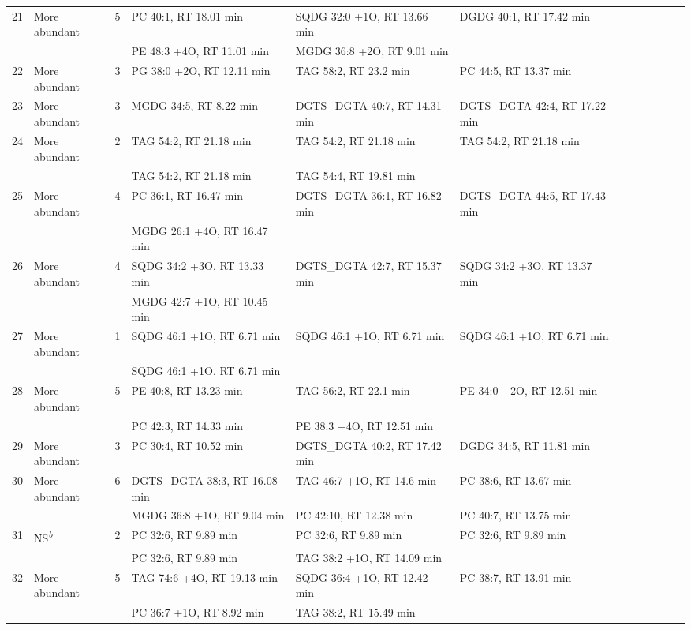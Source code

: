 \begin{landscape}
\begin{footnotesize}
\begin{singlespace}
\begin{flushleft}
\begin{longtable}{ Lp{.03\linewidth} Lp{.12\linewidth} Lp{.03\linewidth} Lp{.24\linewidth} Lp{.24\linewidth} Lp{.24\linewidth} }
21 & More abundant & 5 & PC 40:1, RT 18.01 min & SQDG 32:0 +1O, RT 13.66 min & DGDG 40:1, RT 17.42 min \\
 &  &  & PE 48:3 +4O, RT 11.01 min & MGDG 36:8 +2O, RT 9.01 min &  \\
22 & More abundant & 3 & PG 38:0 +2O, RT 12.11 min & TAG 58:2, RT 23.2 min & PC 44:5, RT 13.37 min \\
23 & More abundant & 3 & MGDG 34:5, RT 8.22 min & DGTS\_DGTA 40:7, RT 14.31 min & DGTS\_DGTA 42:4, RT 17.22 min \\
24 & More abundant & 2 & TAG 54:2, RT 21.18 min & TAG 54:2, RT 21.18 min & TAG 54:2, RT 21.18 min \\
 &  &  & TAG 54:2, RT 21.18 min & TAG 54:4, RT 19.81 min &  \\
25 & More abundant & 4 & PC 36:1, RT 16.47 min & DGTS\_DGTA 36:1, RT 16.82 min & DGTS\_DGTA 44:5, RT 17.43 min \\
 &  &  & MGDG 26:1 +4O, RT 16.47 min &  &  \\
26 & More abundant & 4 & SQDG 34:2 +3O, RT 13.33 min & DGTS\_DGTA 42:7, RT 15.37 min & SQDG 34:2 +3O, RT 13.37 min \\
 &  &  & MGDG 42:7 +1O, RT 10.45 min &  &  \\
27 & More abundant & 1 & SQDG 46:1 +1O, RT 6.71 min & SQDG 46:1 +1O, RT 6.71 min & SQDG 46:1 +1O, RT 6.71 min \\
 &  &  & SQDG 46:1 +1O, RT 6.71 min &  &  \\
28 & More abundant & 5 & PE 40:8, RT 13.23 min & TAG 56:2, RT 22.1 min & PE 34:0 +2O, RT 12.51 min \\
 &  &  & PC 42:3, RT 14.33 min & PE 38:3 +4O, RT 12.51 min &  \\
29 & More abundant & 3 & PC 30:4, RT 10.52 min & DGTS\_DGTA 40:2, RT 17.42 min & DGDG 34:5, RT 11.81 min \\
30 & More abundant & 6 & DGTS\_DGTA 38:3, RT 16.08 min & TAG 46:7 +1O, RT 14.6 min & PC 38:6, RT 13.67 min \\
 &  &  & MGDG 36:8 +1O, RT 9.04 min & PC 42:10, RT 12.38 min & PC 40:7, RT 13.75 min \\
31 & NS\emph{\textsuperscript{b}} & 2 & PC 32:6, RT 9.89 min & PC 32:6, RT 9.89 min & PC 32:6, RT 9.89 min \\
 &  &  & PC 32:6, RT 9.89 min & TAG 38:2 +1O, RT 14.09 min &  \\
32 & More abundant & 5 & TAG 74:6 +4O, RT 19.13 min & SQDG 36:4 +1O, RT 12.42 min & PC 38:7, RT 13.91 min \\
 &  &  & PC 36:7 +1O, RT 8.92 min & TAG 38:2, RT 15.49 min &  \\

\end{longtable}
\end{flushleft}
\end{singlespace}
\end{footnotesize}
\end{landscape}

